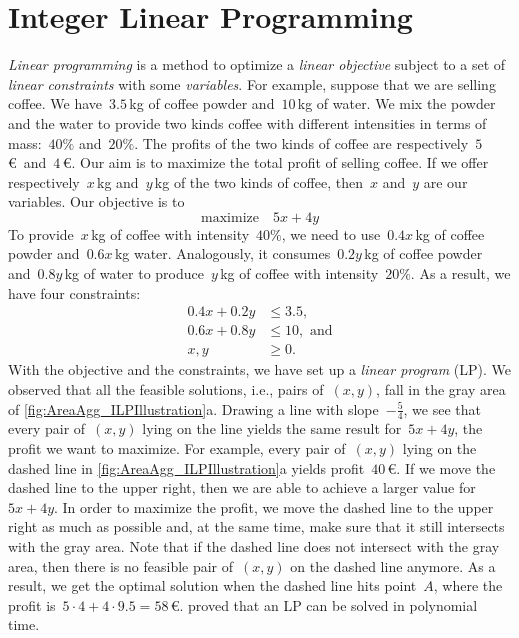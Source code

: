 \section{Integer Linear Programming}
\label{sec:AreaAgg_ILP}

\emph{Linear programming} is a method 
to optimize a \emph{linear objective}
subject to a set of \emph{linear constraints}
with some \emph{variables}.
For example, suppose that we are selling coffee.
We have~$3.5\,$kg of coffee powder and~$10\,$kg of water.
We mix the powder and the water to provide two kinds coffee 
with different intensities in terms of mass:~$40\%$ and~$20\%$.
The profits of the two kinds of coffee 
are respectively~$5\,$\euro~and~$4\,$\euro.
Our aim is to maximize the total profit of selling coffee.
If we offer respectively~$x\,$kg and~$y\,$kg 
of the two kinds of coffee,
then~$x$ and~$y$ are our variables.
Our objective is to
$$
\mathrm{maximize} 	\quad	 5x+4y
$$
To provide~$x\,$kg of coffee with intensity~$40\%$,
we need to use~$0.4x\,$kg of coffee powder 
and~$0.6x\,$kg water.
Analogously, it consumes~$0.2y\,$kg of coffee powder 
and~$0.8y\,$kg of water to produce~$y\,$kg of coffee
with intensity~$20\%$.
As a result, we have four constraints:
\begin{align*}
0.4x+0.2y	&\le 3.5,				\\
0.6x+0.8y 	&\le 10,	\text{~and}			\\
x,y			&\ge 0.
\end{align*}
With the objective and the constraints, 
we have set up a \emph{linear program} (LP).
We observed that 
all the feasible solutions, i.e., pairs of~$(x,y)$,
fall in the gray area of
\fig\ref{fig:AreaAgg_ILPIllustration}a.
Drawing a line with slope~$-\frac{5}{4}$,
we see that every pair of~$(x,y)$ lying on the line
yields the same result for~$5x+4y$, 
the profit we want to maximize.
For example, every pair of~$(x,y)$ lying on the dashed line
in \fig\ref{fig:AreaAgg_ILPIllustration}a 
yields profit~$40\,$\euro.
If we move the dashed line to the upper right,
then we are able to achieve a larger value for~$5x+4y$. 
In order to maximize the profit, 
we move the dashed line to the upper right as much as possible
and, at the same time, make sure that 
it still intersects with the gray area.
Note that if the dashed line 
does not intersect with the gray area,
then there is no feasible pair of~$(x,y)$ 
on the dashed line anymore.
As a result, we get the optimal solution 
when the dashed line hits point~$A$,
where the profit is~$5 \cdot 4 + 4 \cdot 9.5 =58\,$\euro.
\textcite{Karmarkar1984LP}
proved that an LP can be solved in polynomial time.

